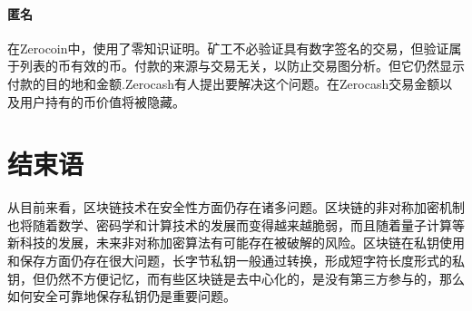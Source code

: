 \documentclass[UTF8,a4paper,10pt, twocolumn]{ctexart}
\begin{document}
\paragraph{匿名}在Zerocoin中，使用了零知识证明。矿工不必验证具有数字签名的交易，但验证属于列表的币有效的币。付款的来源与交易无关，以防止交易图分析。但它仍然显示付款的目的地和金额.Zerocash有人提出要解决这个问题。在Zerocash交易金额以及用户持有的币价值将被隐藏。
\section{结束语}
从目前来看，区块链技术在安全性方面仍存在诸多问题。区块链的非对称加密机制也将随着数学、密码学和计算技术的发展而变得越来越脆弱，而且随着量子计算等新科技的发展，未来非对称加密算法有可能存在被破解的风险。区块链在私钥使用和保存方面仍存在很大问题，长字节私钥一般通过转换，形成短字符长度形式的私钥，但仍然不方便记忆，而有些区块链是去中心化的，是没有第三方参与的，那么如何安全可靠地保存私钥仍是重要问题。
\end{document}
